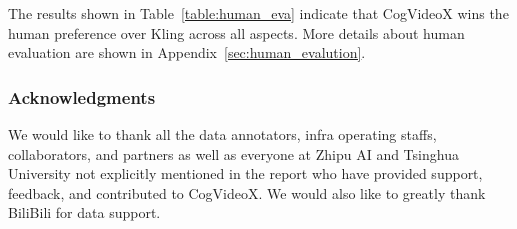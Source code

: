 \documentclass{article} \usepackage{iclr2024_conference,times}
\newcommand{\model}{CogVideoX\xspace}
\begin{document}
The results shown in Table~\ref{table:human_eva} indicate that \model wins the human preference over Kling across all aspects. 
More details about human evaluation are shown in Appendix~\ref{sec:human_evalution}.

\begin{table}[!ht]
\centering
\label{sample-table}
\small
\vspace{-5pt}
\caption{Human evaluation between CogVideoX and Kling.}
\label{table:human_eva}
\end{table} 








 
 
\subsubsection*{Acknowledgments}


We would like to thank all the data annotators, infra operating staffs, collaborators, and partners as well as everyone at Zhipu AI and Tsinghua University not explicitly mentioned in the report who have provided support, feedback, and contributed to \model. 
We would also like to greatly thank BiliBili for data support. 
\end{document}
